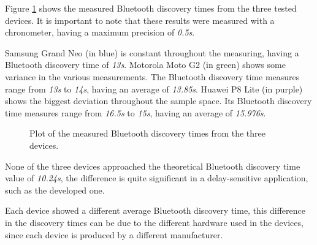 Figure \ref{fig:normaldisc} shows the measured Bluetooth discovery times from the three tested devices. It is important to note that these results were measured with a chronometer, having a maximum precision of \textit{0.5s}.

Samsung Grand Neo (in blue) is constant throughout the measuring, having a Bluetooth discovery time of \textit{13s}. Motorola Moto G2 (in green) shows some variance in the various measurements. The Bluetooth discovery time measures range from \textit{13s} to \textit{14s}, having an average of \textit{13.85s}. Huawei P8 Lite (in purple) shows the biggest deviation throughout the sample space. Its Bluetooth discovery time measures range from \textit{16.5s} to \textit{15s}, having an average of \textit{15.976s}.

\begin{figure}[ht]
	\noindent{}
	\caption{\label{fig:normaldisc} Plot of the measured Bluetooth discovery times from the three devices.}
\end{figure}

None of the three devices approached the theoretical Bluetooth discovery time value of \textit{10.24s}, the difference is quite significant in a delay-sensitive application, such as the developed one.

Each device showed a different average Bluetooth discovery time, this difference in the discovery times can be due to the different hardware used in the devices, since each device is produced by a different manufacturer.

